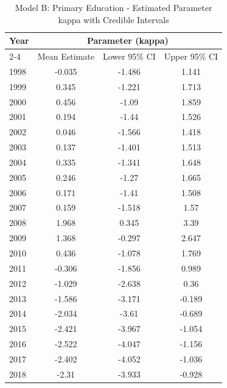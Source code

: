 \begin{landscape}
\begin{table}[htbp]
\centering
\caption{Model B: Primary Education - Estimated Parameter kappa  with Credible Intervals}
\label{tab:Fparameters_k6}
\begin{tabular}{@{}lccc@{}}
\toprule
Year & \multicolumn{3}{c}{Parameter (kappa)} \\
\cmidrule(lr){2-4}
      & Mean Estimate & Lower 95\% CI & Upper 95\% CI \\
\midrule
1998 & -0.035 & -1.486 & 1.141 \\
1999 & 0.345 & -1.221 & 1.713 \\
2000 & 0.456 & -1.09 & 1.859 \\
2001 & 0.194 & -1.44 & 1.526 \\
2002 & 0.046 & -1.566 & 1.418 \\
2003 & 0.137 & -1.401 & 1.513 \\
2004 & 0.335 & -1.341 & 1.648 \\
2005 & 0.246 & -1.27 & 1.665 \\
2006 & 0.171 & -1.41 & 1.508 \\
2007 & 0.159 & -1.518 & 1.57 \\
2008 & 1.968 & 0.345 & 3.39 \\
2009 & 1.368 & -0.297 & 2.647 \\
2010 & 0.436 & -1.078 & 1.769 \\
2011 & -0.306 & -1.856 & 0.989 \\
2012 & -1.029 & -2.638 & 0.36 \\
2013 & -1.586 & -3.171 & -0.189 \\
2014 & -2.034 & -3.61 & -0.689 \\
2015 & -2.421 & -3.967 & -1.054 \\
2016 & -2.522 & -4.047 & -1.156 \\
2017 & -2.402 & -4.052 & -1.036 \\
2018 & -2.31 & -3.933 & -0.928 \\
\bottomrule
\end{tabular}
\end{table}
\end{landscape}